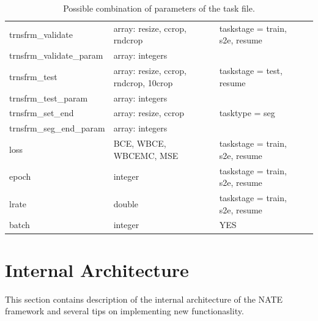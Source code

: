 \documentclass[a4paper, 11pt]{article}
\begin{document}
\begin{center}
\begin{table}
\begin{tabular}{|l|l|l|l|}
\hline 
trnsfrm\_validate & array: resize, ccrop, rndcrop & taskstage = train, s2e, resume \\
trnsfrm\_validate\_param & array: integers & \\
\hline 
trnsfrm\_test & array: resize, ccrop, rndcrop, 10crop & taskstage = test, resume \\
trnsfrm\_test\_param & array: integers & \\
\hline 
trnsfrm\_set\_end & array: resize, ccrop & tasktype = seg \\
trnsfrm\_seg\_end\_param & array: integers & \\
\hline
loss & BCE, WBCE, WBCEMC, MSE & taskstage = train, s2e, resume \\
\hline
epoch & integer & taskstage = train, s2e, resume \\
\hline 
lrate & double & taskstage = train, s2e, resume \\
\hline 
batch & integer & YES\\
\hline 
\end{tabular}
\caption{Possible combination of parameters of the task file.}
\end{table}
\end{center}


\section{Internal Architecture}
This section contains description of the internal architecture of the NATE framework and several tips on implementing new functionaslity.

\end{document}
